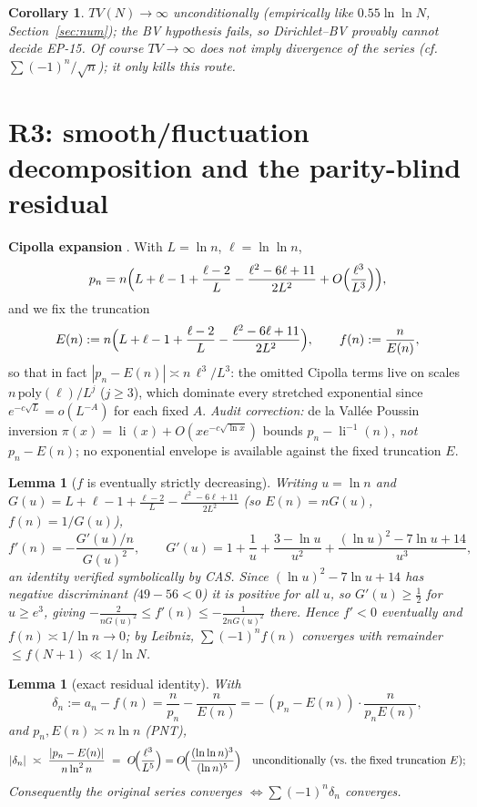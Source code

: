 \documentclass[11pt]{article}
\newtheorem{lemma}[theorem]{Lemma}
\newtheorem{corollary}[theorem]{Corollary}
\theoremstyle{definition}
\begin{document}
\begin{corollary}
$TV(N)\to\infty$ unconditionally (empirically like $0.55\ln\ln N$, Section~\ref{sec:num}); the BV hypothesis fails, so Dirichlet--BV provably cannot decide EP-15. Of course $TV\to\infty$ does not imply divergence of the series (cf.\ $\sum(-1)^n/\sqrt{n}$); it only kills this route.
\end{corollary}

\section{R3: smooth/fluctuation decomposition and the parity-blind residual}\label{sec:r3}

\textbf{Cipolla expansion} \cite{Ci02}. With $L=\ln n$, $\ell=\ln\ln n$,
\[
p_n=n\Bigl(L+\ell-1+\frac{\ell-2}{L}-\frac{\ell^2-6\ell+11}{2L^2}+O\Bigl(\frac{\ell^3}{L^3}\Bigr)\Bigr),
\]
and we fix the truncation
\[
E(n):=n\Bigl(L+\ell-1+\frac{\ell-2}{L}-\frac{\ell^2-6\ell+11}{2L^2}\Bigr),\qquad f(n):=\frac{n}{E(n)},
\]
so that in fact $|p_n-E(n)|\asymp n\,\ell^3/L^3$: the omitted Cipolla terms live on scales $n\,\mathrm{poly}(\ell)/L^{j}$ ($j\ge3$), which dominate every stretched exponential since $e^{-c\sqrt L}=o(L^{-A})$ for each fixed $A$. \emph{Audit correction:} de la Vall\'ee Poussin inversion $\pi(x)=\operatorname{li}(x)+O(xe^{-c\sqrt{\ln x}})$ \cite{vK01,DVLP} bounds $p_n-\operatorname{li}^{-1}(n)$, \emph{not} $p_n-E(n)$; no exponential envelope is available against the fixed truncation $E$.

\begin{lemma}[$f$ is eventually strictly decreasing]\label{lem:f}
Writing $u=\ln n$ and $G(u)=L+\ell-1+\frac{\ell-2}{L}-\frac{\ell^2-6\ell+11}{2L^2}$ (so $E(n)=nG(u)$, $f(n)=1/G(u)$),
\[
f'(n)=-\frac{G'(u)/n}{G(u)^2},\qquad
G'(u)=1+\frac1u+\frac{3-\ln u}{u^2}+\frac{(\ln u)^2-7\ln u+14}{u^3},
\]
an identity verified symbolically by CAS. Since $(\ln u)^2-7\ln u+14$ has negative discriminant ($49-56<0$) it is positive for all $u$, so $G'(u)\ge\tfrac12$ for $u\ge e^3$, giving $-\frac{2}{nG(u)^2}\le f'(n)\le-\frac{1}{2nG(u)^2}$ there. Hence $f'<0$ eventually and $f(n)\asymp1/\ln n\to0$; by Leibniz, $\sum(-1)^nf(n)$ converges with remainder $\le f(N{+}1)\ll1/\ln N$.
\end{lemma}

\begin{lemma}[exact residual identity]\label{lem:delta}
With
\[
\delta_n:=a_n-f(n)=\frac{n}{p_n}-\frac{n}{E(n)}
=-\,(p_n-E(n))\cdot\frac{n}{p_nE(n)},
\]
and $p_n,E(n)\asymp n\ln n$ (PNT),
\begin{equation}\label{eq:env}
|\delta_n|\ \asymp\ \frac{|p_n-E(n)|}{n\ln^2 n}\ =\ O\!\Bigl(\frac{\ell^3}{L^5}\Bigr)
=O\!\Bigl(\frac{(\ln\ln n)^3}{(\ln n)^5}\Bigr)\quad\text{unconditionally (vs.\ the fixed truncation }E\text{)};
\end{equation}
Consequently the original series converges $\iff \sum(-1)^n\delta_n$ converges.
\end{lemma}
\end{document}
